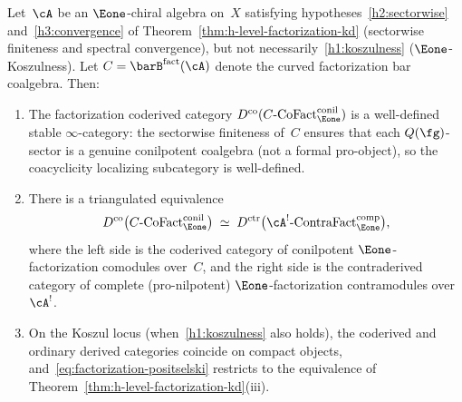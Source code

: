 \begin{theorem}
\label{thm:factorization-positselski}
Let~$\cA$ be an $\Eone$-chiral algebra on~$X$ satisfying
hypotheses~\ref{h2:sectorwise} and~\ref{h3:convergence} of
Theorem~\textup{\ref{thm:h-level-factorization-kd}}
\textup{(}sectorwise finiteness and spectral convergence\textup{)},
but not necessarily~\ref{h1:koszulness}
\textup{(}$\Eone$-Koszulness\textup{)}.
Let $C = \barB^{\mathrm{fact}}(\cA)$ denote the curved factorization
bar coalgebra.  Then:
\begin{enumerate}[label=\textup{(\roman*)}]
\item The factorization coderived category
  $D^{\mathrm{co}}(C\text{-}\mathrm{CoFact}_{\Eone}^{\mathrm{conil}})$
  is a well-defined stable $\infty$-category: the sectorwise
  finiteness of~$C$ ensures that each $Q(\fg)$-sector is a
  genuine conilpotent coalgebra \textup{(}not a formal
  pro-object\textup{)}, so the coacyclicity localizing
  subcategory is well-defined.
\item There is a triangulated equivalence
  \begin{equation}\label{eq:factorization-positselski}
  D^{\mathrm{co}}\bigl(
    C\text{-}\mathrm{CoFact}_{\Eone}^{\mathrm{conil}}
  \bigr)
  \;\simeq\;
  D^{\mathrm{ctr}}\bigl(
    \cA^!\text{-}\mathrm{ContraFact}_{\Eone}^{\mathrm{comp}}
  \bigr),
  \end{equation}
  where the left side is the coderived category of conilpotent
  $\Eone$-factorization comodules over~$C$, and the right side is
  the contraderived category of complete \textup{(}pro-nilpotent\textup{)}
  $\Eone$-factorization contramodules over~$\cA^!$.
\item On the Koszul locus \textup{(}when~\ref{h1:koszulness}
  also holds\textup{)}, the coderived and ordinary derived categories
  coincide on compact objects, and~\eqref{eq:factorization-positselski}
  restricts to the equivalence of
  Theorem~\textup{\ref{thm:h-level-factorization-kd}(iii)}.
\end{enumerate}
\end{theorem}

